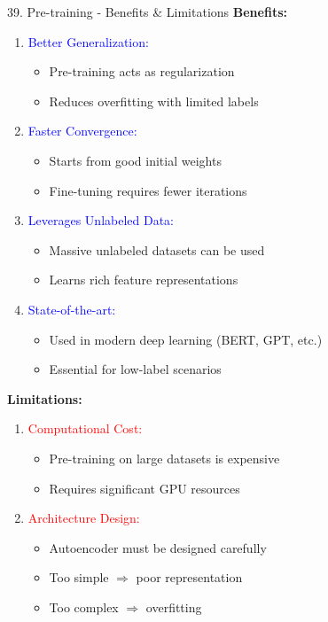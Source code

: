 \documentclass[8pt]{beamer}
\begin{document}
	\begin{frame}{39. Pre-training - Benefits \& Limitations}
		\fontsize{6.5}{7.5}\selectfont
		\textbf{Benefits:}
		
		\begin{enumerate}
			\item \textcolor{blue}{Better Generalization:}
			\begin{itemize}
				\item Pre-training acts as regularization
				\item Reduces overfitting with limited labels
			\end{itemize}
			
			\item \textcolor{blue}{Faster Convergence:}
			\begin{itemize}
				\item Starts from good initial weights
				\item Fine-tuning requires fewer iterations
			\end{itemize}
			
			\item \textcolor{blue}{Leverages Unlabeled Data:}
			\begin{itemize}
				\item Massive unlabeled datasets can be used
				\item Learns rich feature representations
			\end{itemize}
			
			\item \textcolor{blue}{State-of-the-art:}
			\begin{itemize}
				\item Used in modern deep learning (BERT, GPT, etc.)
				\item Essential for low-label scenarios
			\end{itemize}
		\end{enumerate}
		
		\textbf{Limitations:}
		
		\begin{enumerate}
			\item \textcolor{red}{Computational Cost:}
			\begin{itemize}
				\item Pre-training on large datasets is expensive
				\item Requires significant GPU resources
			\end{itemize}
			
			\item \textcolor{red}{Architecture Design:}
			\begin{itemize}
				\item Autoencoder must be designed carefully
				\item Too simple $\Rightarrow$ poor representation
				\item Too complex $\Rightarrow$ overfitting
			\end{itemize}
			

\end{enumerate}
\end{frame}
\end{document}
